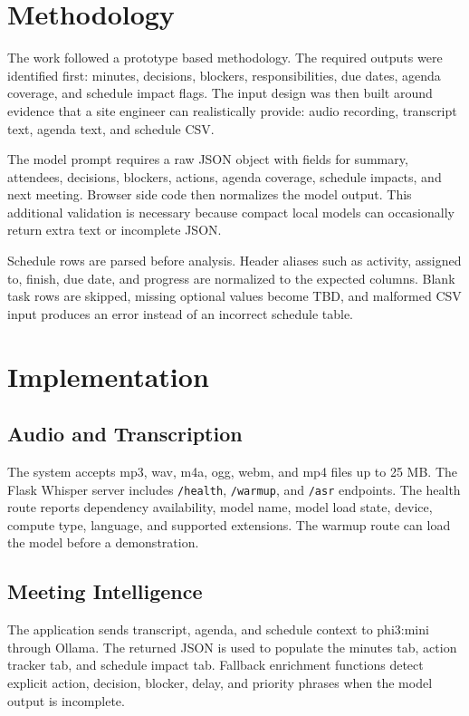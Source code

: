\documentclass[conference]{IEEEtran}
\begin{document}
\section{Methodology}
The work followed a prototype based methodology. The required outputs were identified first: minutes, decisions, blockers, responsibilities, due dates, agenda coverage, and schedule impact flags. The input design was then built around evidence that a site engineer can realistically provide: audio recording, transcript text, agenda text, and schedule CSV.

The model prompt requires a raw JSON object with fields for summary, attendees, decisions, blockers, actions, agenda coverage, schedule impacts, and next meeting. Browser side code then normalizes the model output. This additional validation is necessary because compact local models can occasionally return extra text or incomplete JSON.

Schedule rows are parsed before analysis. Header aliases such as activity, assigned to, finish, due date, and progress are normalized to the expected columns. Blank task rows are skipped, missing optional values become TBD, and malformed CSV input produces an error instead of an incorrect schedule table.

\section{Implementation}
\subsection{Audio and Transcription}
The system accepts mp3, wav, m4a, ogg, webm, and mp4 files up to 25 MB. The Flask Whisper server includes \texttt{/health}, \texttt{/warmup}, and \texttt{/asr} endpoints. The health route reports dependency availability, model name, model load state, device, compute type, language, and supported extensions. The warmup route can load the model before a demonstration.

\subsection{Meeting Intelligence}
The application sends transcript, agenda, and schedule context to phi3:mini through Ollama. The returned JSON is used to populate the minutes tab, action tracker tab, and schedule impact tab. Fallback enrichment functions detect explicit action, decision, blocker, delay, and priority phrases when the model output is incomplete.
\end{document}
